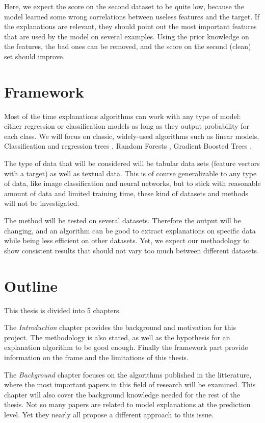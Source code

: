 \documentclass[a4paper,11pt]{kth-mag}
\begin{document}
Here, we expect the score on the second dataset to be quite low, because the model learned some wrong correlations between useless features and the target. If the explanations are relevant, they should point out the most important features that are used by the model on several examples. Using the prior knowledge on the features, the bad ones can be removed, and the score on the second (clean) set should improve.

\section{Framework}

Most of the time explanations algorithms can work with any type of model: either regression or classification models as long as they output probability for each class. We will focus on classic, widely-used algorithms such as linear models, Classification and regression trees \cite{cart}, Random Forests \cite{Breiman2001}, Gradient Boosted Trees \cite{Friedman2001}.

The type of data that will be considered will be tabular data sets (feature vectors with a target) as well as textual data. This is of course generalizable to any type of data, like image classification and neural networks, but to stick with reasonable amount of data and limited training time, these kind of datasets and methods will not be investigated.

The method will be tested on several datasets. Therefore the output will be changing, and an algorithm can be good to extract explanations on specific data while being less efficient on other datasets. Yet, we expect our methodology to show consistent results that should not vary too much between different datasets.

\section{Outline}

This thesis is divided into 5 chapters.

The \textit{Introduction} chapter provides the background and motivation for this project. The methodology is also stated, as well as the hypothesis for an explanation algorithm to be good enough. Finally the framework part provide information on the frame and the limitations of this thesis.

The \textit{Background} chapter focuses on the algorithms published in the litterature, where the most important papers in this field of research will be examined. This chapter will also cover the background knowledge needed for the rest of the thesis. Not so many papers are related to model explanations at the prediction level. Yet they nearly all propose a different approach to this issue.
\end{document}
